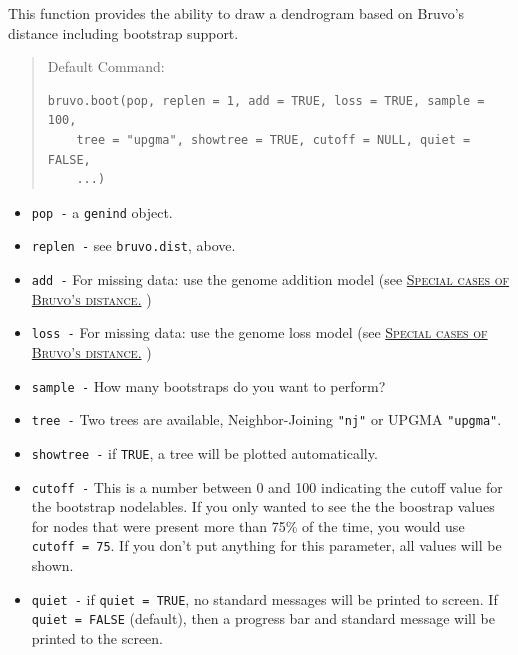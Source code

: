 \documentclass[letterpaper]{article}\usepackage[]{graphicx}\usepackage[]{color}
\makeatletter
\newenvironment{kframe}{%
 \def\at@end@of@kframe{}%
 \ifinner\ifhmode%
  \def\at@end@of@kframe{\end{minipage}}%
  \begin{minipage}{\columnwidth}%
 \fi\fi%
 \def\FrameCommand##1{\hskip\@totalleftmargin \hskip-\fboxsep
 \colorbox{shadecolor}{##1}\hskip-\fboxsep
     \hskip-\linewidth \hskip-\@totalleftmargin \hskip\columnwidth}%
 \MakeFramed {\advance\hsize-\width
   \@totalleftmargin\z@ \linewidth\hsize
   \@setminipage}}%
 {\par\unskip\endMakeFramed%
 \at@end@of@kframe}
\newenvironment{knitrout}{}{} %
\newcommand{\tab}{\hspace*{1em}}
\newcommand{\seclink}[2]{
  \textsc{\hyperref[#1]{#2}}
}
\makeatother
\begin{document}
\tab\tab This function provides the ability to draw a dendrogram based on Bruvo's distance including bootstrap support. 
\begin{quote}
Default Command:
\begin{knitrout}
\color{fgcolor}\begin{kframe}
\begin{verbatim}
bruvo.boot(pop, replen = 1, add = TRUE, loss = TRUE, sample = 100, 
    tree = "upgma", showtree = TRUE, cutoff = NULL, quiet = FALSE, 
    ...)
\end{verbatim}
\end{kframe}
\end{knitrout}

\end{quote}
\begin{itemize}
  \item \texttt{pop -} a \texttt{genind} object.
  \item \texttt{replen -} see \texttt{bruvo.dist}, above.
  \item \texttt{add -} For missing data: use the genome addition model (see\seclink{appendix:algorithm:bruvospecial}{Special cases of Bruvo's distance.})
  \item \texttt{loss -} For missing data: use the genome loss model (see\seclink{appendix:algorithm:bruvospecial}{Special cases of Bruvo's distance.})
  \item \texttt{sample -} How many bootstraps do you want to perform? 
  \item \texttt{tree -} Two trees are available, Neighbor-Joining \texttt{"nj"} or UPGMA \texttt{"upgma"}.
  \item \texttt{showtree -} if \texttt{TRUE}, a tree will be plotted automatically.
  \item \texttt{cutoff -} This is a number between 0 and 100 indicating the cutoff value for the bootstrap nodelables. If you only wanted to see the the boostrap values for nodes that were present more than 75\% of the time, you would use \texttt{cutoff = 75}. If you don't put anything for this parameter, all values will be shown.
  \item \texttt{quiet -} if \texttt{quiet = TRUE}, no standard messages will be printed to screen. If \texttt{quiet = FALSE} (default), then a progress bar and standard message will be printed to the screen.
\end{itemize}
\end{document}
